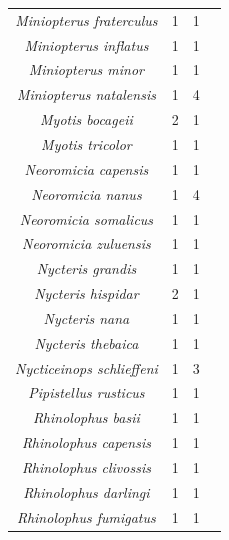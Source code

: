 \documentclass[9pt,twoside,lineno]{pnas-new}
\begin{document}
\begin{longtable}{cccp{5cm}}
\textit{Miniopterus fraterculus} & 1 & 1 & \cite{Bernard1980Reproductive1906}\\
\textit{Miniopterus inflatus} & 1 & 1 & \cite{Brosset1969LaGabon}\\
\textit{Miniopterus minor} & 1 & 1 & \cite{McWilliam1988TheTropics}\\
\textit{Miniopterus natalensis} & 1 & 4 & \cite{Bernard1996OnZimbabwe,Bernard1980Reproductive1906,Bernard1994EffectsSchreibersii.,vanderMerwe1979FoetalNatalensis}\\
\textit{Myotis bocageii} & 2 & 1 & \cite{Brosset1966LaChiropteres}\\
\textit{Myotis tricolor} & 1 & 1 & \cite{Bernard1981MonthlyChiroptera}\\
\textit{Neoromicia capensis} & 1 & 1 & \cite{vanderMerwe1994ReproductiveAfrica}\\
\textit{Neoromicia nanus} & 1 & 4 & \cite{vanderMerwe2006Aspects1833,LaVal1977ReproductionNanus,Bernard1997SpermMalawi,OShea1980EcologicalCommunity}\\
\textit{Neoromicia somalicus} & 1 & 1 & \cite{OShea1980EcologicalCommunity}\\
\textit{Neoromicia zuluensis} & 1 & 1 & \cite{Happold1990ReproductiveAfrica}\\
\textit{Nycteris grandis} & 1 & 1 & \cite{FENTON1987ForagingZimbabwe}\\
\textit{Nycteris hispidar} & 2 & 1 & \cite{Verschuren1957EcologieChiropteres}\\
\textit{Nycteris nana} & 1 & 1 & \cite{Verschuren1957EcologieChiropteres}\\
\textit{Nycteris thebaica} & 1 & 1 & \cite{Bernard1982FemaleAfrica}\\
\textit{Nycticeinops schlieffeni} & 1 & 3 & \cite{VanderMerweN.J.Rautenbach1988AVespertilionidae,OShea1980EcologicalCommunity,Happold1990ReproductiveAfrica}\\
\textit{Pipistellus rusticus} & 1 & 1 & \cite{vanderMerwe1990ReproductionAfrica.}\\
\textit{Rhinolophus basii} & 1 & 1 & \cite{Happold1990ReproductiveAfrica}\\
\textit{Rhinolophus capensis} & 1 & 1 & \cite{Bernard1983ReproductionAfrica}\\
\textit{Rhinolophus clivossis} & 1 & 1 & \cite{Bernard1983ReproductionAfrica}\\
\textit{Rhinolophus darlingi} & 1 & 1 & \cite{Smithers1979CheckRhodesia}\\
\textit{Rhinolophus fumigatus} & 1 & 1 & \cite{Happold1990ReproductiveAfrica}\\

\end{longtable}
\end{document}
